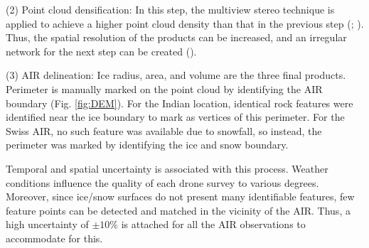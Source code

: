 (2) Point cloud densification: In this step, the multiview stereo technique is applied to achieve a higher
point cloud density than that in the previous step (\cite{furukawaAccurateDenseRobust2010};
\cite{molgStructurefromMotionUsingHistorical2017}). Thus, the spatial resolution of the products can be
increased, and an irregular network for the next step can be created (\cite{kungACCURACYAUTOMATICPHOTOGRAMMETRIC2011}).

(3) \ac{AIR} delineation: Ice radius, area, and volume are the three final products. Perimeter is manually marked
on the point cloud by identifying the \ac{AIR} boundary (Fig. \ref{fig:DEM}). For the Indian location, identical rock features were identified
near the ice boundary to mark as vertices of this perimeter. For the Swiss \ac{AIR}, no such feature was available due
to snowfall, so instead, the perimeter was marked by identifying the ice and snow boundary.

Temporal and spatial uncertainty is associated with this process. Weather conditions influence the quality
of each drone survey to various degrees. Moreover, since ice/snow surfaces do not present many identifiable features, few
feature points can be detected and matched in the vicinity of the \ac{AIR}. Thus, a high uncertainty of
$\pm 10 \%$ is attached for all the \ac{AIR} observations to accommodate for this.

